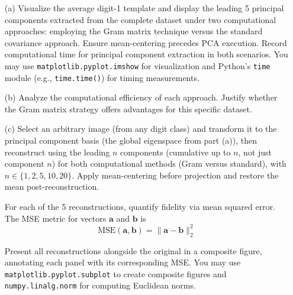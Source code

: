 \documentclass[11pt,addpoints,answers]{exam}
\begin{document}
\begin{enumerate}
		
		\begin{enumerate}
			\item[(a)] Visualize the average digit-1 template and display the leading 5 principal components extracted from the complete dataset under two computational approaches: employing the Gram matrix technique versus the standard covariance approach.  
			Ensure mean-centering precedes PCA execution. Record computational time for principal component extraction in both scenarios. You may use \texttt{matplotlib.pyplot.imshow} for visualization and Python's \texttt{time} module (e.g., \texttt{time.time()}) for timing measurements.
			
			\item[(b)] Analyze the computational efficiency of each approach. Justify whether the Gram matrix strategy offers advantages for this specific dataset.
			
			\item[(c)] Select an arbitrary image (from any digit class) and transform it to the principal component basis (the global eigenspace from part (a)), then reconstruct using the leading $n$ components (cumulative up to $n$, not just component $n$) for both computational methods (Gram versus standard), with $n \in \{1, 2, 5, 10, 20\}$. Apply mean-centering before projection and restore the mean post-reconstruction.
			
			For each of the 5 reconstructions, quantify fidelity via mean squared error. The MSE metric for vectors $\mathbf{a}$ and $\mathbf{b}$ is 
			\[
			\text{MSE}(\mathbf{a}, \mathbf{b}) = \|\mathbf{a} - \mathbf{b}\|_{2}^{2}
			\]
			
			Present all reconstructions alongside the original in a composite figure, annotating each panel with its corresponding MSE. You may use \texttt{matplotlib.pyplot.subplot} to create composite figures and \texttt{numpy.linalg.norm} for computing Euclidean norms.
		\end{enumerate}

		
		
	\end{enumerate}
	
	\clearpage
	
	
\end{document}
